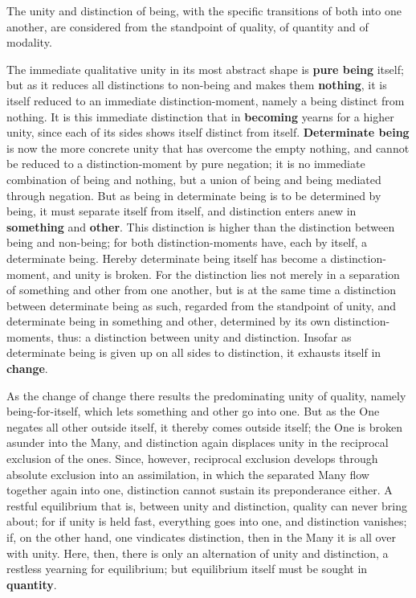 \documentclass[12pt,a4paper,openany]{book}
\newcommand{\opage}[1]{\marginnote{\footnotesize\textit{[#1]}}}
\begin{document}
The unity and distinction of being, with the specific transitions of both into one another, are considered from the standpoint of quality, of quantity and of modality.

The immediate qualitative unity in its most abstract shape is \textbf{pure being} itself; but as it reduces all distinctions to non-being and makes them \textbf{nothing}, it is itself reduced to an immediate distinction-moment, namely a being distinct from nothing. It is this immediate distinction that in \textbf{becoming} yearns for a higher unity, since each of its sides shows itself distinct from itself. \textbf{Determinate being} is now the more concrete unity that has overcome the empty nothing, and cannot be reduced to a distinction-moment by pure negation; it is no immediate combination of being and nothing, but a union of being and being mediated through negation. But as being in determinate being is to be determined by being, it must separate itself from itself, and distinction enters anew in
\setcounter{footnote}{0}%
\opage{73}\textbf{something} and \textbf{other}. This distinction is higher than the distinction between being and non-being; for both distinction-moments have, each by itself, a determinate being. Hereby determinate being itself has become a distinction-moment, and unity is broken. For the distinction lies not merely in a separation of something and other from one another, but is at the same time a distinction between determinate being as such, regarded from the standpoint of unity, and determinate being in something and other, determined by its own distinction-moments, thus: a distinction between unity and distinction. Insofar as determinate being is given up on all sides to distinction, it exhausts itself in \textbf{change}.

As the change of change there results the predominating unity of quality, namely being-for-itself, which lets something and other go into one. But as the One negates all other outside itself, it thereby comes outside itself; the One is broken asunder into the Many, and distinction again displaces unity in the reciprocal exclusion of the ones. Since, however, reciprocal exclusion develops through absolute exclusion into an assimilation, in which the separated Many flow together again into one, distinction cannot sustain its preponderance either. A restful equilibrium that is, between unity and distinction, quality can never bring about; for if unity is held fast, everything goes into one, and distinction vanishes; if, on the other hand, one vindicates distinction, then in the Many it is all over with unity. Here, then, there is only an alternation of unity and distinction, a restless yearning for equilibrium; but equilibrium itself must be sought in \textbf{quantity}.
\end{document}
